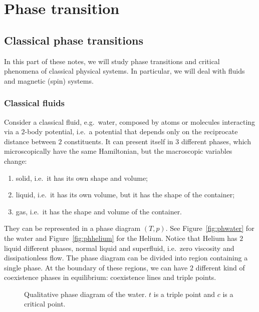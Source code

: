 \part{Phase transition}

\chapter{Classical phase transitions}

    In this part of these notes, we will study phase transitions and critical phenomena of classical physical systems. In particular, we will deal with fluids and magnetic (spin) systems.

\section{Classical fluids}

    Consider a classical fluid, e.g.~water, composed by atoms or molecules interacting via a $2$-body potential, i.e.~a potential that depends only on the reciprocate distance between $2$ constituents. It can present itself in $3$ different phases, which microscopically have the same Hamiltonian, but the macroscopic variables change:
    \begin{enumerate}
        \item solid, i.e.~it has its own shape and volume;
        \item liquid, i.e.~it has its own volume, but it has the shape of the container;
        \item gas, i.e.~it has the shape and volume of the container. 
    \end{enumerate}
    They can be represented in a phase diagram $(T,p)$. See Figure~\eqref{fig:phwater} for the water and Figure~\eqref{fig:phhelium} for the Helium. Notice that Helium has $2$ liquid different phases, normal liquid and superfluid, i.e.~zero viscosity and dissipationless flow. The phase diagram can be divided into region containing a single phase. At the boundary of these regions, we can have $2$ different kind of coexistence phases in equilibrium: coexistence lines and triple points.  

    \begin{figure}[h!]
        \centering
        \caption{Qualitative phase diagram of the water. $t$ is a triple point and $c$ is a critical point.}
        \label{fig:phwater}
    \end{figure}

